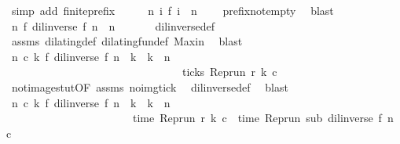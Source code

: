 \begin{isabellebody}
\ {\isacharparenleft}simp\ add{\isacharcolon}\ finite{\isacharunderscore}prefix{\isacharparenright}\isanewline
\ \ \isamarkupfalse%
\ \isamarkupfalse%
\ {\isacartoucheopen}{\isasymforall}n{\isachardot}\ {\isacharbraceleft}i{\isachardot}\ f\ i\ {\isasymle}\ n{\isacharbraceright}\ {\isasymnoteq}\ {\isacharbraceleft}{\isacharbraceright}{\isacartoucheclose}\ \isamarkupfalse%
\ prefix{\isacharunderscore}not{\isacharunderscore}empty\ \isamarkupfalse%
\ blast\isanewline
\ \ \isamarkupfalse%
\ \isamarkupfalse%
\ {}{\isacharcolon}{\isacartoucheopen}{\isasymforall}n{\isachardot}\ f\ {\isacharparenleft}{\isacharparenleft}dil{\isacharunderscore}inverse\ f{\isacharparenright}\ n{\isacharparenright}\ {\isasymle}\ n{\isacartoucheclose}\ \isanewline
\ \ \ \ \isamarkupfalse%
\ dil{\isacharunderscore}inverse{\isacharunderscore}def\isanewline
\ \ \ \ \isamarkupfalse%
\ assms{\isacharparenleft}{}{\isacharparenright}\ dilating{\isacharunderscore}def\ dilating{\isacharunderscore}fun{\isacharunderscore}def\ Max{\isacharunderscore}in\ \isamarkupfalse%
\ blast\isanewline
\isanewline
\ \ \isamarkupfalse%
\ {}{\isacharcolon}{\isacartoucheopen}{\isasymforall}n\ c\ k{\isachardot}\ f\ {\isacharparenleft}{\isacharparenleft}dil{\isacharunderscore}inverse\ f{\isacharparenright}\ n{\isacharparenright}\ {\isacharless}\ k\ {\isasymand}\ k\ {\isasymle}\ n\isanewline
\ \ \ \ \ \ \ \ \ \ \ \ \ \ \ \ \ \ \ \ \ \ \ \ \ \ \ \ \ \ {\isasymlongrightarrow}\ {\isasymnot}\ ticks\ {\isacharparenleft}{\isacharparenleft}Rep{\isacharunderscore}run\ r{\isacharparenright}\ k\ c{\isacharparenright}{\isacartoucheclose}\isanewline
\ \ \ \ \isamarkupfalse%
\ not{\isacharunderscore}image{\isacharunderscore}stut{\isacharbrackleft}OF\ assms{\isacharbrackright}\ no{\isacharunderscore}img{\isacharunderscore}tick\ \isamarkupfalse%
\ dil{\isacharunderscore}inverse{\isacharunderscore}def\ \isamarkupfalse%
\ blast\isanewline
\isanewline
\ \ \isamarkupfalse%
\ {}{\isacharcolon}{\isacartoucheopen}{\isacharparenleft}{\isasymforall}n\ c\ k{\isachardot}\ f\ {\isacharparenleft}{\isacharparenleft}dil{\isacharunderscore}inverse\ f{\isacharparenright}\ n{\isacharparenright}\ {\isasymle}\ k\ {\isasymand}\ k\ {\isasymle}\ n\isanewline
\ \ \ \ \ \ \ \ \ \ \ \ \ \ \ \ \ \ \ \ \ \ {\isasymlongrightarrow}\ time\ {\isacharparenleft}{\isacharparenleft}Rep{\isacharunderscore}run\ r{\isacharparenright}\ k\ c{\isacharparenright}\ {\isacharequal}\ time\ {\isacharparenleft}{\isacharparenleft}Rep{\isacharunderscore}run\ sub{\isacharparenright}\ {\isacharparenleft}{\isacharparenleft}dil{\isacharunderscore}inverse\ f{\isacharparenright}\ n{\isacharparenright}\ c{\isacharparenright}{\isacharparenright}{\isacartoucheclose}\isanewline

\end{isabellebody}
